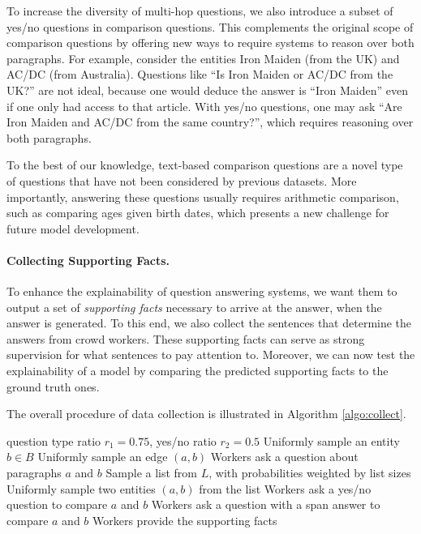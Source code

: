 To increase the diversity of multi-hop questions, we also introduce a subset of yes/no questions in comparison questions.
This complements the original scope of comparison questions by offering new ways to require systems to reason over both paragraphs.
For example, consider the entities Iron Maiden (from the UK) and AC/DC (from Australia).
Questions like ``Is Iron Maiden or AC/DC from the UK?'' are not ideal, because one would deduce the answer is ``Iron Maiden'' even if one only had access to that article.
With yes/no questions, one may ask ``Are Iron Maiden and AC/DC from the same country?'', which requires reasoning over both paragraphs.

To the best of our knowledge, text-based comparison questions are a novel type of questions that have not been considered by previous datasets.
More importantly, answering these questions usually requires arithmetic comparison, such as comparing ages given birth dates, which presents a new challenge for future model development.

\paragraph{Collecting Supporting Facts.}
To enhance the explainability of question answering systems, we want them to output a set of \emph{supporting facts} necessary to arrive at the answer, when the answer is generated.
To this end, we also collect the sentences that determine the answers from crowd workers.
These supporting facts can serve as strong supervision for what sentences to pay attention to.
Moreover, we can now test the explainability of a model by comparing the predicted supporting facts to the ground truth ones.

The overall procedure of data collection is illustrated in Algorithm \ref{algo:collect}.

\begin{algorithm}[t]
\small
    \caption{Overall data collection procedure}
    \label{algo:collect}
\begin{algorithmic}
     question type ratio $r_1=0.75$, yes/no ratio $r_2=0.5$
            \STATE Uniformly sample an entity $b \in B$
            \STATE Uniformly sample an edge $(a, b)$
            \STATE Workers ask a question about paragraphs $a$ and $b$
        \ELSE
            \STATE Sample a list from $L$, with probabilities weighted by list sizes
            \STATE Uniformly sample two entities $(a, b)$ from the list
                \STATE Workers ask a yes/no question to compare $a$ and $b$
            \ELSE
                \STATE Workers ask a question with a span answer to compare $a$ and $b$
            \ENDIF
        \ENDIF
        \STATE Workers provide the supporting facts
    \ENDWHILE
\end{algorithmic}
\end{algorithm}





